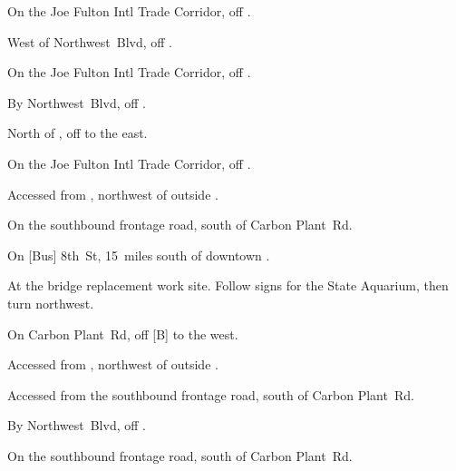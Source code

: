 

\begin{LocationList}

On the Joe Fulton Intl Trade Corridor, off  .

\Location{\GarageHQ \Garage}
West of  Northwest~Blvd, off .

On the Joe Fulton Intl Trade Corridor, off  .

By  Northwest~Blvd, off .

North of , off   to the east.

On the Joe Fulton Intl Trade Corridor, off  .

Accessed from , northwest of  outside .

\Location{\RecruitmentAgency \Recruitment}
On the southbound  frontage road, south of Carbon Plant~Rd.

On [Bus] 8th~St, 15~miles south of downtown .

At the  bridge replacement work site. Follow signs for the State Aquarium, then turn northwest.

\Location{\TruckStop \Gas \Rest \Service}
On Carbon Plant~Rd, off  [B] to the west.

Accessed from , northwest of  outside .

Accessed from the southbound  frontage road, south of Carbon Plant~Rd.

By  Northwest~Blvd, off .

On the southbound  frontage road, south of Carbon Plant~Rd.

\end{LocationList}



